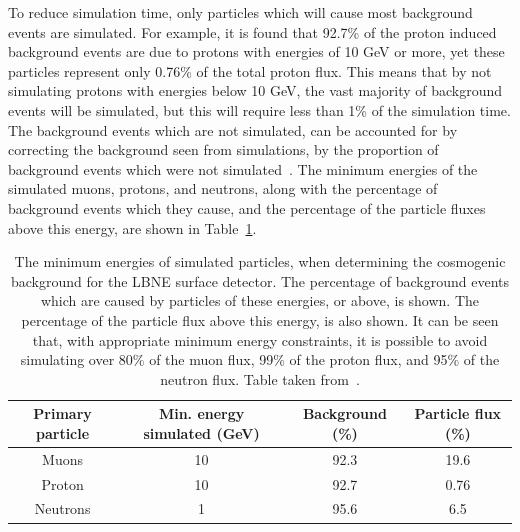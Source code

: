 To reduce simulation time, only particles which will cause most background events are simulated. For example, it is found that 92.7\% of the proton induced background events are due to protons with energies of 10 GeV or more, yet these particles represent only 0.76\% of the total proton flux. This means that by not simulating protons with energies below 10 GeV, the vast majority of background events will be simulated, but this will require less than 1\% of the simulation time. The background events which are not simulated, can be accounted for by correcting the background seen from simulations, by the proportion of background events which were not simulated~\citep{MartinsThesis}. The minimum energies of the simulated muons, protons, and neutrons, along with the percentage of background events which they cause, and the percentage of the particle fluxes above this energy, are shown in Table~\ref{tab:SurfEnPrim}. \\

\begin{table}
  \caption[The minimum energies of simulated particles, when determining the cosmogenic background for the LBNE surface detector]
          {The minimum energies of simulated particles, when determining the cosmogenic background for the LBNE surface detector. The percentage of background events which are caused by particles of these energies, or above, is shown. The percentage of the particle flux above this energy, is also shown. It can be seen that, with appropriate minimum energy constraints, it is possible to avoid simulating over 80\% of the muon flux, 99\% of the proton flux, and 95\% of the neutron flux. Table taken from~\citep{MartinsThesis}.}
  \centering
  \label{tab:SurfEnPrim}
  \begin{tabular}{c c c c}
    \toprule
        {Primary particle} & {Min. energy simulated (GeV)} & {Background (\%)} & {Particle flux (\%)} \\ 
        \midrule
        Muons              & 10                            & 92.3              & 19.6                 \\

        Proton             & 10                            & 92.7              & 0.76                 \\

        Neutrons           & 1                             & 95.6              & 6.5                  \\
    \bottomrule
  \end{tabular}
\end{table}

